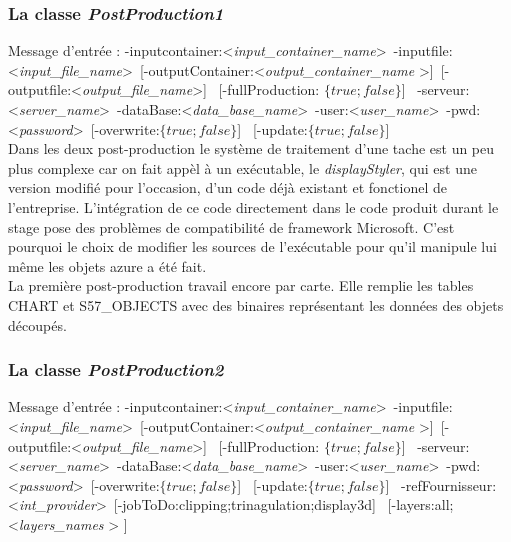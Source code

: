 \subsubsection{La classe \textit{PostProduction1}}
Message d'entrée : 
-inputcontainer:\textless \textit{input\_container\_name}\textgreater \   
-inputfile:\textless \textit{input\_file\_name}\textgreater \ 
[-outputContainer:\textless \textit{output\_container\_name} \textgreater ]\  
[-outputfile:\textless \textit{output\_file\_name}\textgreater ] \ 
[-fullProduction: $\{true;false\}$] \ 
-serveur:\textless \textit{server\_name}\textgreater \   
-dataBase:\textless \textit{data\_base\_name}\textgreater \   
-user:\textless \textit{user\_name}\textgreater  \ 
-pwd:\textless \textit{password}\textgreater  \ 
[-overwrite:$\{true;false\}$] \ 
[-update:$\{true;false\}$] \\ 

Dans les deux post-production le système de traitement d'une tache est
un peu plus complexe car on fait appèl à un exécutable, le
\textit{displayStyler}, qui est une version modifié pour l'occasion,
d'un code déjà existant et fonctionel de l'entreprise. L'intégration
de ce code directement dans le code produit durant le stage pose des
problèmes de compatibilité de framework Microsoft. C'est pourquoi le
choix de modifier les sources de l'exécutable pour qu'il manipule lui
même les objets azure a été fait.\\

La première post-production travail encore par carte. Elle remplie les
tables CHART et S57\_OBJECTS avec des binaires représentant les
données des objets découpés.


\subsubsection{La classe \textit{PostProduction2}}
Message d'entrée : 
-inputcontainer:\textless \textit{input\_container\_name}\textgreater \   
-inputfile:\textless \textit{input\_file\_name}\textgreater \ 
[-outputContainer:\textless \textit{output\_container\_name} \textgreater ]\  
[-outputfile:\textless \textit{output\_file\_name}\textgreater ] \ 
[-fullProduction: $\{true;false\}$] \ 
-serveur:\textless \textit{server\_name}\textgreater \   
-dataBase:\textless \textit{data\_base\_name}\textgreater \   
-user:\textless \textit{user\_name}\textgreater  \ 
-pwd:\textless \textit{password}\textgreater  \ 
[-overwrite:$\{true;false\}$] \ 
[-update:$\{true;false\}$] \ 
-refFournisseur:\textless \textit{int\_provider}\textgreater \   
[-jobToDo:{clipping;trinagulation;display3d}] \ 
[-layers:{all;\textless \textit{layers\_names} \textgreater} ] \\

